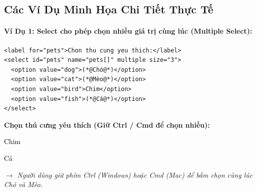 \documentclass[11pt,oneside]{book}
\begin{document}
\subsection{Các Ví Dụ Minh Họa Chi Tiết Thực Tế}

\paragraph{Ví Dụ 1: Select cho phép chọn nhiều giá trị cùng lúc (Multiple Select):}

\begin{codeWindow}
\begin{lstlisting}[language=HTML5]
<label for="pets">Chon thu cung yeu thich:</label>
<select id="pets" name="pets[]" multiple size="3">
  <option value="dog">(*@Chó@*)</option>
  <option value="cat">(*@Mèo@*)</option>
  <option value="bird">Chim</option>
  <option value="fish">(*@Cá@*)</option>
</select>
\end{lstlisting}
\end{codeWindow}

\begin{browserWindow}
\sffamily\small
\textbf{Chọn thú cưng yêu thích (Giữ Ctrl / Cmd để chọn nhiều):} \par\vspace{4pt}
\begin{tcolorbox}[arc=2pt, colback=white, colframe=primaryBlue!50, boxsep=3pt, width=0.55\linewidth]
  \small
   \par\vspace{2pt}
   \par\vspace{2pt}
  \textcolor{black}{Chim} \par\vspace{2pt}
  \textcolor{black}{Cá}
\end{tcolorbox}
\par\vspace{4pt}
\textcolor{codeComment}{\small\textit{$\rightarrow$ Người dùng giữ phím Ctrl (Windows) hoặc Cmd (Mac) để bấm chọn cùng lúc Chó và Mèo.}}
\end{browserWindow}
\end{document}

